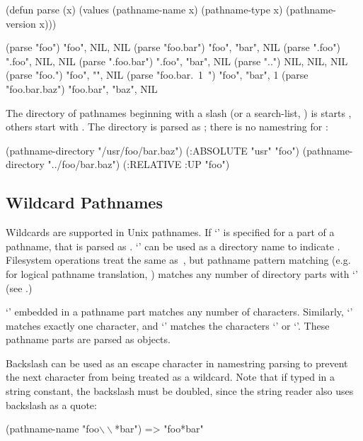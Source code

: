 \begin{example}
(defun parse (x)
  (values (pathname-name x) (pathname-type x) (pathname-version x)))

(parse "foo") \result "foo", NIL, NIL
(parse "foo.bar") \result "foo", "bar", NIL
(parse ".foo") \result ".foo", NIL, NIL
(parse ".foo.bar") \result ".foo", "bar", NIL
(parse "..") \result NIL, NIL, NIL
(parse "foo.") \result "foo", "", NIL
(parse "foo.bar.~1~") \result "foo", "bar", 1
(parse "foo.bar.baz") \result "foo.bar", "baz", NIL
\end{example}

The directory of pathnames beginning with a slash (or a search-list,
) is starts , others start with
.  The  directory is parsed as ; there is no
namestring for :

\begin{example}
(pathname-directory "/usr/foo/bar.baz") \result (:ABSOLUTE "usr" "foo")
(pathname-directory "../foo/bar.baz") \result (:RELATIVE :UP "foo")
\end{example}


\subsection{Wildcard Pathnames}

Wildcards are supported in Unix pathnames.  If `\code{*}' is specified for a
part of a pathname, that is parsed as .  `\code{**}' can be used as a
directory name to indicate .  Filesystem operations
treat  the same as\ , but pathname pattern
matching (e.g. for logical pathname translation, )
matches any number of directory parts with `\code{**}' (see
.)

`\code{*}' embedded in a pathname part matches any number of characters.
Similarly, `' matches exactly one character, and `\code{[a,b]}'
matches the characters `' or `'.  These pathname parts are
parsed as  objects.

Backslash can be used as an escape character in namestring
parsing to prevent the next character from being treated as a wildcard.  Note
that if typed in a string constant, the backslash must be doubled, since the
string reader also uses backslash as a quote:

\begin{example}
(pathname-name "foo\(\backslash\backslash\)*bar") => "foo*bar"
\end{example}


